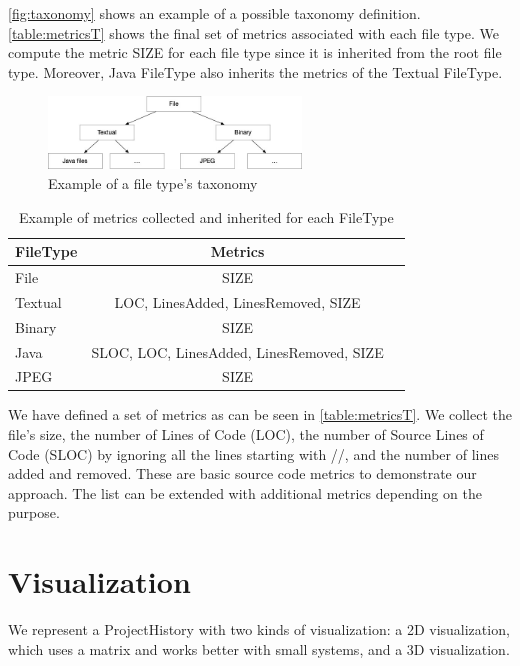 \autoref{fig:taxonomy} shows an example of a possible taxonomy definition. \autoref{table:metricsT} shows the final set of metrics associated with each file type. We compute the metric SIZE for each file type since it is inherited from the root file type. Moreover, Java FileType also inherits the metrics of the Textual FileType.  

\begin{figure}[ht]
    \centering
    \includegraphics[width=0.6\textwidth]{Taxonomy.jpg}
    \caption{Example of a file type's taxonomy}
    \label{fig:taxonomy}
\end{figure}

\begin{table}[ht]
    \centering
    \begin{tabular}{lcr} \hline
        {\bf FileType} & {\bf Metrics}\\ \hline
        File    & SIZE      \\
        Textual & LOC, LinesAdded, LinesRemoved, SIZE \\
        Binary  & SIZE         \\
        Java    & SLOC, LOC, LinesAdded, LinesRemoved, SIZE \\
        JPEG    & SIZE \\
    \end{tabular}
    \caption{Example of metrics collected and inherited for each FileType}
    \label{table:metricsT}
\end{table}

We have defined a set of metrics as can be seen in \autoref{table:metricsT}. We collect the file's size, the number of Lines of Code (LOC), the number of Source Lines of Code (SLOC) by ignoring all the lines starting with //, and the number of lines added and removed. These are basic source code metrics to demonstrate our approach. The list can be extended with additional metrics depending on the purpose.


\section{Visualization}
We represent a ProjectHistory with two kinds of visualization: a 2D visualization, which uses a matrix and works better with small systems, and a 3D visualization. 


